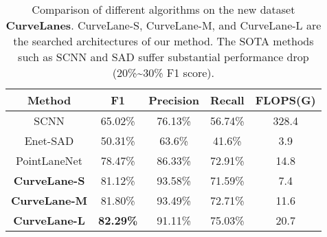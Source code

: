 \documentclass[runningheads]{llncs}
\providecommand{\tabularnewline}{\\}
\begin{document}
\begin{table}[tb]


\caption{\label{tab:CurveLanes}Comparison of different algorithms on the new
dataset \textbf{CurveLanes}. CurveLane-S, CurveLane-M, and CurveLane-L
are the searched architectures of our method. The SOTA methods such
as SCNN and SAD suffer substantial performance drop (20\%\textasciitilde 30\%
F1 score).}



\begin{centering}
\tabcolsep 0.03in{\footnotesize{}}\begin{tabular}{ccccc}
\hline 
{\footnotesize{}Method} & {\footnotesize{}F1} & {\footnotesize{}Precision} & {\footnotesize{}Recall} & {\footnotesize{}FLOPS(G)}\tabularnewline
\hline 
{\footnotesize{}SCNN \cite{pan2018spatial}} & {\footnotesize{}65.02\%} & {\footnotesize{}76.13\%} & {\footnotesize{}56.74\%} & {\footnotesize{}328.4}\tabularnewline
{\footnotesize{}Enet-SAD \cite{hou2019learning}} & {\footnotesize{}50.31\%} & {\footnotesize{}63.6\%} & {\footnotesize{}41.6\%} & {\footnotesize{}3.9}\tabularnewline
{\footnotesize{}PointLaneNet \cite{chen2019pointlanenet}} & {\footnotesize{}78.47\%} & {\footnotesize{}86.33\%} & {\footnotesize{}72.91\%} & {\footnotesize{}14.8}\tabularnewline
\hline 
\textbf{\footnotesize{}CurveLane-S} & {\footnotesize{}81.12\%} & {\footnotesize{}93.58\%} & {\footnotesize{}71.59\%} & {\footnotesize{}7.4}\tabularnewline
\textbf{\footnotesize{}CurveLane-M} & {\footnotesize{}81.80\%} & {\footnotesize{}93.49\%} & {\footnotesize{}72.71\%} & {\footnotesize{}11.6}\tabularnewline
\textbf{\footnotesize{}CurveLane-L} & \textbf{\footnotesize{}82.29\%} & {\footnotesize{}91.11\%} & {\footnotesize{}75.03\%} & {\footnotesize{}20.7}\tabularnewline
\hline 
\end{tabular}{\footnotesize\par}
\par\end{centering}

\end{table}
\end{document}
